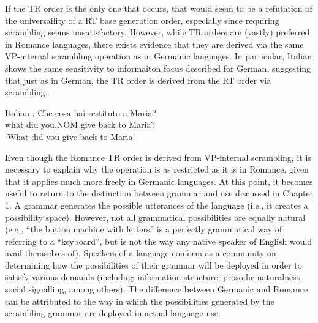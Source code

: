 If the TR order is the only one that occurs, that would seem to be a refutation of the universaility of a RT base generation order, especially since requiring scrambling seems unsatisfactory. However, while TR orders are (vastly) preferred in Romance languages, there exists evidence that they are derived via the same VP-internal scrambling operation as in Germanic languages. In particular, Italian shows the same sensitivity to informaiton focus described for German, suggesting that just as in German, the TR order is derived from the RT order via scrambling.

\begin{exe}
\ex Italian \citep[ex 26]{Belletti.1995}:
\gll Che cosa hai restituto a Maria?\\
what did you.NOM {give back} to Maria?\\
\trans `What did you give back to Maria'
\begin{xlist}
\end{xlist} 
\end{exe}%

Even though the Romance TR order is derived from VP-internal scrambling, it is necessary to explain why the operation is as restricted as it is in Romance, given that it applies much more freely in Germanic languages. At this point, it becomes useful to return to the distinction between grammar and use discussed in Chapter 1. A grammar generates the possible utterances of the language (i.e., it creates a possibility space). However, not all grammatical possibilities are equally natural (e.g., ``the button machine with letters'' is a perfectly grammatical way of referring to a ``keyboard'', but is not the way any native speaker of English would avail themselves of). Speakers of a language conform as a community on determining how the possibilities of their grammar will be deployed in order to satisfy various demands (including information structure, prosodic naturalness, social signalling, among others). The difference between Germanic and Romance can be attributed to the way in which the possibilities generated by the scrambling grammar are deployed in actual language use.

